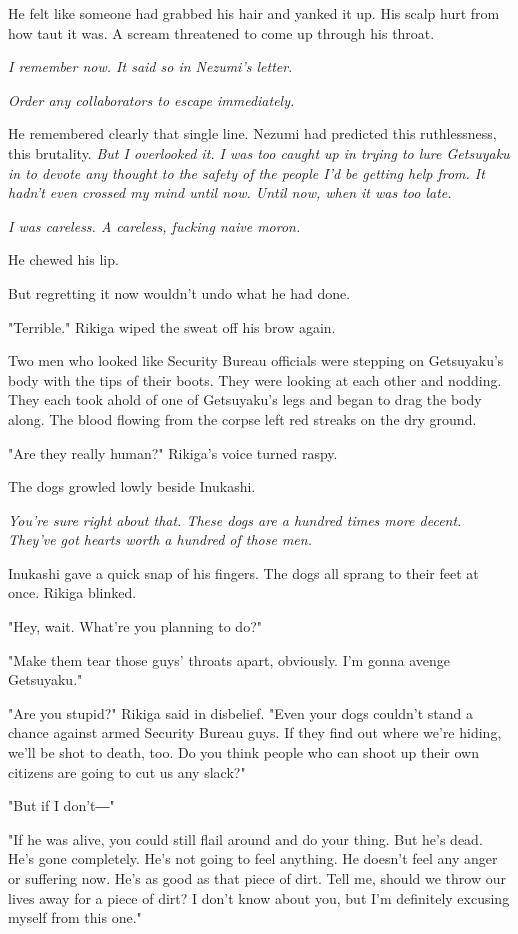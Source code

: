 He felt like someone had grabbed his hair and yanked it up. His scalp
hurt from how taut it was. A scream threatened to come up through his
throat.

\emph{I remember now. It said so in Nezumi's letter.}

\emph{Order any collaborators to escape immediately.}

He remembered clearly that single line. Nezumi had predicted this
ruthlessness, this brutality. \emph{But I overlooked it. I was too caught up
in trying to lure Getsuyaku in to devote any thought to the safety of
the people I'd be getting help from. It hadn't even crossed my mind
until now. Until now, when it was too late.}

\emph{I was careless. A careless, fucking naive moron.}

He chewed his lip.

But regretting it now wouldn't undo what he had done.

"Terrible." Rikiga wiped the sweat off his brow again.

Two men who looked like Security Bureau officials were stepping on
Getsuyaku's body with the tips of their boots. They were looking at each
other and nodding. They each took ahold of one of Getsuyaku's legs and
began to drag the body along. The blood flowing from the corpse left red
streaks on the dry ground.

"Are they really human?" Rikiga's voice turned raspy.

The dogs growled lowly beside Inukashi.

\emph{You're sure right about that. These dogs are a hundred times more
decent. They've got hearts worth a hundred of those men.}

Inukashi gave a quick snap of his fingers. The dogs all sprang to their
feet at once. Rikiga blinked.

"Hey, wait. What're you planning to do?"

"Make them tear those guys' throats apart, obviously. I'm gonna avenge
Getsuyaku."

"Are you stupid?" Rikiga said in disbelief. "Even your dogs couldn't
stand a chance against armed Security Bureau guys. If they find out
where we're hiding, we'll be shot to death, too. Do you think people who
can shoot up their own citizens are going to cut us any slack?"

"But if I don't―"

"If he was alive, you could still flail around and do your thing. But
he's dead. He's gone completely. He's not going to feel anything. He
doesn't feel any anger or suffering now. He's as good as that piece of
dirt. Tell me, should we throw our lives away for a piece of dirt? I
don't know about you, but I'm definitely excusing myself from this one."

